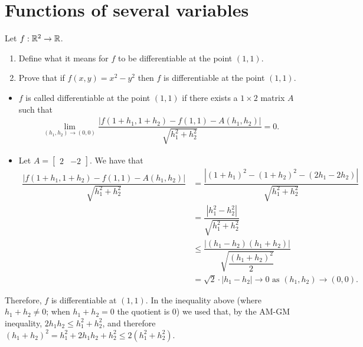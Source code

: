 \section{Functions of several variables}\label{p:several-variables}

\begin{problem}
Let $f : \mathbb{R}^2 \to \mathbb{R}$.
\begin{enumerate}
    \item[(a)] Define what it means for $f$ to be differentiable at the point $(1,1)$.
    \item[(b)] Prove that if $f(x,y) = x^2 - y^2$ then $f$ is differentiable at the point $(1,1)$.
\end{enumerate}
\begin{solution}
\begin{itemize}
    \item[(a)] $f$ is called differentiable at the point $(1,1)$ if there exists a $1 \times 2$ matrix $A$ such that
    \begin{align*}
        \lim_{(h_1,h_2) \to (0,0)} \dfrac{|f(1+h_1, 1+h_2) - f(1, 1) - A(h_1, h_2)|}{\sqrt{h_1^2 + h_2^2}} = 0.
    \end{align*}
    \item[(b)] Let $A = \begin{bmatrix} 2 & -2 \end{bmatrix}$. We have that 
    \begin{align*}
       \dfrac{|f(1+h_1, 1+h_2) - f(1, 1) - A(h_1, h_2)|}{\sqrt{h_1^2 + h_2^2}} 
       &=\dfrac{|(1+h_1)^2 - (1+h_2)^2 - (2h_1-2h_2)|}{\sqrt{h_1^2 + h_2^2}}\\
       &=\dfrac{|h_1^2 - h_2^2|}{\sqrt{h_1^2 + h_2^2}}\\
       &\le \dfrac{|(h_1 - h_2)(h_1 + h_2)|}{\sqrt{\dfrac{(h_1 + h_2)^2}{2}}}\\
       &=\sqrt{2} \cdot |h_1 - h_2| \to 0 \text{ as } (h_1, h_2) \to (0, 0).
    \end{align*}
\end{itemize}
Therefore, $f$ is differentiable at $(1, 1)$. In the inequality above (where $h_1+h_2\neq 0$; when $h_1+h_2=0$ the quotient is $0$) we used that, by the AM-GM inequality, $2 h_1 h_2 \leq h_1^2 + h_2^2$, and therefore $(h_1 + h_2)^2 = h_1^2 + 2h_1h_2 + h_2^2 \leq 2(h_1^2 + h_2^2)$.
\end{solution}
\end{problem}


